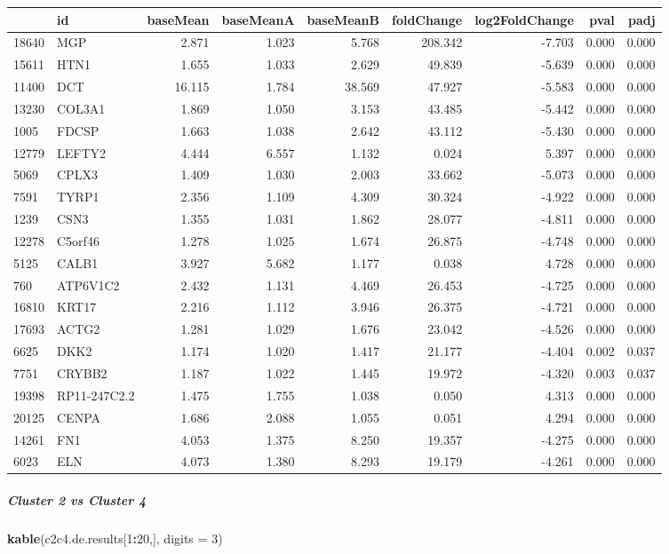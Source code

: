 \documentclass[]{article}
\newenvironment{Shaded}{\begin{snugshade}}{\end{snugshade}}
\newcommand{\DataTypeTok}[1]{\textcolor[rgb]{0.13,0.29,0.53}{#1}}
\newcommand{\DecValTok}[1]{\textcolor[rgb]{0.00,0.00,0.81}{#1}}
\newcommand{\KeywordTok}[1]{\textcolor[rgb]{0.13,0.29,0.53}{\textbf{#1}}}
\newcommand{\NormalTok}[1]{#1}
\newcommand{\OperatorTok}[1]{\textcolor[rgb]{0.81,0.36,0.00}{\textbf{#1}}}
\let\oldsubparagraph\subparagraph
\renewcommand{\subparagraph}[1]{\oldsubparagraph{#1}\mbox{}}
\begin{document}
\begin{longtable}[]{@{}llrrrrrrr@{}}
\toprule
& id & baseMean & baseMeanA & baseMeanB & foldChange & log2FoldChange &
pval & padj\tabularnewline
\midrule
\endhead
18640 & MGP & 2.871 & 1.023 & 5.768 & 208.342 & -7.703 & 0.000 &
0.000\tabularnewline
15611 & HTN1 & 1.655 & 1.033 & 2.629 & 49.839 & -5.639 & 0.000 &
0.000\tabularnewline
11400 & DCT & 16.115 & 1.784 & 38.569 & 47.927 & -5.583 & 0.000 &
0.000\tabularnewline
13230 & COL3A1 & 1.869 & 1.050 & 3.153 & 43.485 & -5.442 & 0.000 &
0.000\tabularnewline
1005 & FDCSP & 1.663 & 1.038 & 2.642 & 43.112 & -5.430 & 0.000 &
0.000\tabularnewline
12779 & LEFTY2 & 4.444 & 6.557 & 1.132 & 0.024 & 5.397 & 0.000 &
0.000\tabularnewline
5069 & CPLX3 & 1.409 & 1.030 & 2.003 & 33.662 & -5.073 & 0.000 &
0.000\tabularnewline
7591 & TYRP1 & 2.356 & 1.109 & 4.309 & 30.324 & -4.922 & 0.000 &
0.000\tabularnewline
1239 & CSN3 & 1.355 & 1.031 & 1.862 & 28.077 & -4.811 & 0.000 &
0.000\tabularnewline
12278 & C5orf46 & 1.278 & 1.025 & 1.674 & 26.875 & -4.748 & 0.000 &
0.000\tabularnewline
5125 & CALB1 & 3.927 & 5.682 & 1.177 & 0.038 & 4.728 & 0.000 &
0.000\tabularnewline
760 & ATP6V1C2 & 2.432 & 1.131 & 4.469 & 26.453 & -4.725 & 0.000 &
0.000\tabularnewline
16810 & KRT17 & 2.216 & 1.112 & 3.946 & 26.375 & -4.721 & 0.000 &
0.000\tabularnewline
17693 & ACTG2 & 1.281 & 1.029 & 1.676 & 23.042 & -4.526 & 0.000 &
0.000\tabularnewline
6625 & DKK2 & 1.174 & 1.020 & 1.417 & 21.177 & -4.404 & 0.002 &
0.037\tabularnewline
7751 & CRYBB2 & 1.187 & 1.022 & 1.445 & 19.972 & -4.320 & 0.003 &
0.037\tabularnewline
19398 & RP11-247C2.2 & 1.475 & 1.755 & 1.038 & 0.050 & 4.313 & 0.000 &
0.000\tabularnewline
20125 & CENPA & 1.686 & 2.088 & 1.055 & 0.051 & 4.294 & 0.000 &
0.000\tabularnewline
14261 & FN1 & 4.053 & 1.375 & 8.250 & 19.357 & -4.275 & 0.000 &
0.000\tabularnewline
6023 & ELN & 4.073 & 1.380 & 8.293 & 19.179 & -4.261 & 0.000 &
0.000\tabularnewline
\bottomrule
\end{longtable}

\hypertarget{cluster-2-vs-cluster-4}{%
\subparagraph{Cluster 2 vs Cluster 4}\label{cluster-2-vs-cluster-4}}

\begin{Shaded}
\begin{Highlighting}[]
\KeywordTok{kable}\NormalTok{(c2c4.de.results[}\DecValTok{1}\OperatorTok{:}\DecValTok{20}\NormalTok{,], }\DataTypeTok{digits =} \DecValTok{3}\NormalTok{)}
\end{Highlighting}
\end{Shaded}
\end{document}
